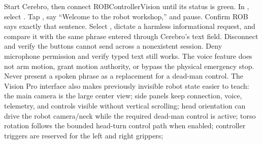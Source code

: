 {}\markdownRendererSectionBegin
{}\markdownRendererInterblockSeparator
{}\markdownRendererOlBegin
{}Start Cerebro, then connect ROBControllerVision until its status is green.\markdownRendererOlItemEnd 
{}In , select .\markdownRendererOlItemEnd 
{}Tap , say “Welcome to the robot workshop,” and pause. Confirm ROB\markdownRendererSoftLineBreak
{}says exactly that sentence.\markdownRendererOlItemEnd 
{}Select , dictate a harmless informational request, and compare it\markdownRendererSoftLineBreak
{}with the same phrase entered through Cerebro's text field.\markdownRendererOlItemEnd 
{}Disconnect and verify the buttons cannot send across a nonexistent session.\markdownRendererOlItemEnd 
{}Deny microphone permission and verify typed text still works.\markdownRendererOlItemEnd 
\markdownRendererOlEnd \markdownRendererInterblockSeparator
{}The voice feature does not arm motion, grant motion authority, or bypass the\markdownRendererSoftLineBreak
{}physical emergency stop. Never present a spoken phrase as a replacement for a\markdownRendererSoftLineBreak
{}dead-man control.\markdownRendererInterblockSeparator
{}
\markdownRendererSectionEnd \markdownRendererSectionBegin
{}\markdownRendererInterblockSeparator
{}The Vision Pro interface also makes previously invisible robot state easier to\markdownRendererSoftLineBreak
{}teach:\markdownRendererInterblockSeparator
{}\markdownRendererUlBegin
\markdownRendererUlItem the main camera is the large center view;\markdownRendererUlItemEnd 
\markdownRendererUlItem side panels keep connection, voice, telemetry, and controls visible without\markdownRendererSoftLineBreak
{}vertical scrolling;\markdownRendererUlItemEnd 
\markdownRendererUlItem head orientation can drive the robot camera/neck while the required\markdownRendererSoftLineBreak
{}dead-man control is active;\markdownRendererUlItemEnd 
\markdownRendererUlItem torso rotation follows the bounded head-turn control path when enabled;\markdownRendererUlItemEnd 
\markdownRendererUlItem controller triggers are reserved for the left and right grippers;\markdownRendererUlItemEnd 
